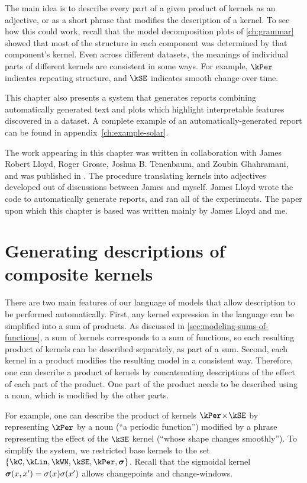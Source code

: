 The main idea is to describe every part of a given product of kernels as an adjective, or as a short phrase that modifies the description of a kernel.
To see how this could work, recall that the model decomposition plots of \cref{ch:grammar} showed that most of the structure in each component was determined by that component's kernel.
Even across different datasets, the meanings of individual parts of different kernels are consistent in some ways.
For example, $\kPer$ indicates repeating structure, and $\kSE$ indicates smooth change over time.

This chapter also presents a system that generates reports combining automatically generated text and plots which highlight interpretable features discovered in a dataset.
A complete example of an automatically-generated report can be found in appendix~\ref{ch:example-solar}.

The work appearing in this chapter was written in collaboration with James Robert Lloyd, Roger Grosse, Joshua B. Tenenbaum, and Zoubin Ghahramani, and was published in \citet{LloDuvGroetal14}.
The procedure translating kernels into adjectives developed out of discussions between James and myself.
James Lloyd wrote the code to automatically generate reports, and ran all of the experiments.
The paper upon which this chapter is based was written mainly by James Lloyd and me.%


\section{Generating descriptions of composite kernels}

There are two main features of our language of \gp{} models that allow description to be performed automatically.
First, any kernel expression in the language can be simplified into a sum of products.
As discussed in \cref{sec:modeling-sums-of-functions}, a sum of kernels corresponds to a sum of functions, so each resulting product of kernels can be described separately, as part of a sum.
Second, each kernel in a product modifies the resulting model in a consistent way.
Therefore, one can describe a product of kernels by concatenating descriptions of the effect of each part of the product.
One part of the product needs to be described using a noun, which is modified by the other parts.

For example, one can describe the product of kernels $\kPer \kerntimes \kSE$ by representing $\kPer$ by a noun (``a periodic function'') modified by a phrase representing the effect of the $\kSE$ kernel (``whose shape changes smoothly'').
To simplify the system, we restricted base kernels to the set $\{\kC, \kLin, \kWN, \kSE, \kPer, \vsigma\}$.
Recall that the sigmoidal kernel ${\boldsymbol{\sigma}}(x, x') = \sigma(x)\sigma(x')$ allows changepoints and change-windows.


